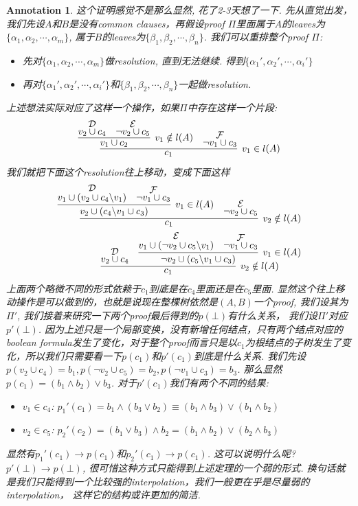 \documentclass{article}
\newtheorem{annotation}[theorem]{Annotation}
\begin{document}
\begin{annotation}
\rm 这个证明感觉不是那么显然, 花了2-3天想了一下. 先从直觉出发，我们先设$A$和$B$是没有common clauses，再假设proof $\varPi$里面属于$A$的leaves为$\{\alpha_1, \alpha_2, \cdots, \alpha_m\}$, 属于$B$的leaves为$\{\beta_1, \beta_2, \cdots, \beta_n\}$. 我们可以重排整个proof $\varPi$: 
\begin{itemize}
	\item 先对$\{\alpha_1, \alpha_2, \cdots, \alpha_m\}$做resolution, 直到无法继续. 得到$\{\alpha_1', \alpha_2', \cdots, \alpha_i'\}$
	\item 再对$\{\alpha_1', \alpha_2', \cdots, \alpha_i'\}$和$\{\beta_1, \beta_2, \cdots, \beta_n\}$一起做resolution.
\end{itemize}
上述想法实际对应了这样一个操作，如果$\varPi$中存在这样一个片段:
\[
	\infer[v_1 \in l(A)]{c_1}{\infer[v_1 \notin l(A)]{v_1 \cup c_2}{\deduce{v_2 \cup c_4}{\mathcal{D}} & \deduce{\neg v_2 \cup c_5}{\mathcal{E}}} & \deduce{\neg v_1 \cup c_3}{\mathcal{F}}}
\]
我们就把下面这个resolution往上移动，变成下面这样
\[
	\begin{aligned}
	\infer[v_2 \notin l(A)]{c_1}{\infer[v_1 \in l(A)]{v_2 \cup (c_4 \backslash v_1 \cup c_3)}{\deduce{v_1 \cup (v_2 \cup c_4 \backslash v_1)}{\mathcal{D}} & \deduce{\neg v_1 \cup c_3}{\mathcal{F}}} & \deduce{\neg v_2 \cup c_5}{\mathcal{E}}}\\ 
	\infer[v_2 \notin l(A)]{c_1}{\deduce{v_2 \cup c_4 }{\mathcal{D}} & \infer[v_1 \in l(A)]{\neg v_2 \cup (c_5 \backslash v_1 \cup c_3)}{\deduce{v_1 \cup (\neg v_2 \cup c_5 \backslash v_1)}{\mathcal{E}} & \deduce{\neg v_1 \cup c_3}{\mathcal{F}}}}
	\end{aligned}
\]
上面两个略微不同的形式依赖于$c_1$到底是在$c_4$里面还是在$c_5$里面. 显然这个往上移动操作是可以做到的，也就是说现在整棵树依然是$(A,B)$一个proof, 我们设其为$\varPi'$, 我们接着来研究一下两个proof最后得到的$p(\bot)$有什么关系， 我们设$\varPi'$对应$p'(\bot)$. 因为上述只是一个局部变换，没有新增任何结点，只有两个结点对应的boolean formula发生了变化，对于整个proof而言只是以$c_1$为根结点的子树发生了变化，所以我们只需要看一下$p(c_1)$和$p'(c_1)$到底是什么关系. 我们先设$p(v_2 \cup c_4) = b_1, p(\neg v_2 \cup c_5) = b_2, p(\neg v_1 \cup c_3) = b_3$. 那么显然$p(c_1) = (b_1 \wedge b_2) \vee b_3$. 对于$p'(c_1)$我们有两个不同的结果:
\begin{itemize}
	\item $v_1 \in c_4$: $p_1'(c_1) = b_1 \wedge (b_3 \vee b_2) \equiv (b_1 \wedge b_3) \vee (b_1 \wedge b_2)$
	\item $v_2 \in c_5$: $p_2'(c_2) = (b_1 \vee b_3) \wedge b_2 = (b_1 \wedge b_2) \vee (b_2 \wedge b_3)$
\end{itemize}
显然有$p_1'(c_1) \to p(c_1)$和$p_2'(c_1) \to p(c_1)$. 这可以说明什么呢? $p'(\bot) \to p(\bot)$, 很可惜这种方式只能得到上述定理的一个弱的形式. 换句话就是我们只能得到一个比较强的interpolation，我们一般更在乎是尽量弱的interpolation， 这样它的结构或许更加的简洁.



\end{annotation}
\end{document}
